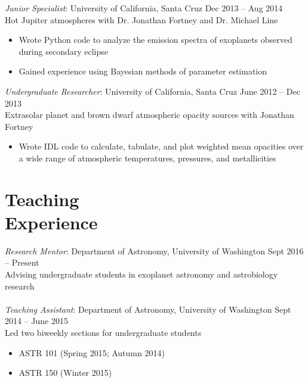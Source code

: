 \documentclass[margin,10pt]{res}
\begin{document}
\begin{resume}
                {\sl Junior Specialist}: University of California, Santa Cruz \hfill          Dec 2013 -- Aug 2014\\
                Hot Jupiter atmospheres with Dr. Jonathan Fortney and Dr. Michael Line
                    \begin{itemize}  \itemsep -1pt %
                        \item Wrote Python code to analyze the emission spectra of exoplanets observed during secondary eclipse
                        \item Gained experience using Bayesian methods of parameter estimation
                    \end{itemize}  
                    
                {\sl Undergraduate Researcher}: University of California, Santa Cruz \hfill          June 2012 -- Dec 2013\\
                Extrasolar planet and brown dwarf atmospheric opacity sources with Jonathan Fortney
                    \begin{itemize}  \itemsep -1pt %
                        \item Wrote IDL code to calculate, tabulate, and plot weighted mean opacities over a wide range of atmospheric temperatures, pressures, and metallicities\\
                    \end{itemize}
   
\section{Teaching \\Experience} 
                {\sl Research Mentor}: Department of Astronomy, University of Washington \hfill Sept 2016 -- Present\\
                Advising undergraduate students in exoplanet astronomy and astrobiology research\\
                \\
                {\sl Teaching Assistant}: Department of Astronomy, University of Washington   \hfill          Sept 2014 -- June 2015\\
                Led two biweekly sections for undergraduate students
                    \begin{itemize}  \itemsep -1pt %
                        \item ASTR 101 (Spring 2015; Autumn 2014)
                        \item ASTR 150 (Winter 2015)
                    \end{itemize}  
                

\end{resume}
\end{document}
